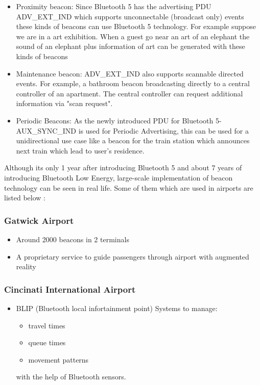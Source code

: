 \documentclass[journal, a4paper]{IEEEtran}
\begin{document}
\begin{itemize}
\item Proximity beacon: Since Bluetooth 5 has the advertising PDU ADV\_EXT\_IND which supports unconnectable (broadcast only) events these kinds of beacons can use Bluetooth 5 technology. For example suppose we are in a art exhibition. When a guest go near an art of an elephant the sound of an elephant plus information of art can be generated with these kinds of beacons

\item Maintenance beacon: ADV\_EXT\_IND also supports scannable directed events. For example, a bathroom beacon broadcasting directly to a central controller of an apartment. The central controller can request additional information via "scan request".

\item Periodic Beacons: As the newly introduced PDU for Bluetooth 5-AUX\_SYNC\_IND is used for Periodic Advertising, this can be used for a unidirectional use case like a beacon for the train station which announces next train which lead to user's residence. 
\end{itemize}

Although its only 1 year after introducing Bluetooth 5 and about 7 years of introducing Bluetooth Low Energy, large-scale implementation of beacon technology can be seen in real life. Some of them which are used in airports are listed below \cite{BEACONS}:

\subsubsection{Gatwick Airport}

\begin{itemize}
\item Around 2000 beacons in 2 terminals
\item A proprietary service to guide passengers through airport with augmented reality
\end{itemize}

\subsubsection{Cincinati International Airport}
\begin{itemize}
\item BLIP (Bluetooth local infortainment point) Systems to manage:
	\begin{itemize}
	\item travel times
	\item queue times 
	\item movement patterns
	\end{itemize}
	with the help of Bluetooth sensors.
\end{itemize}
\end{document}
